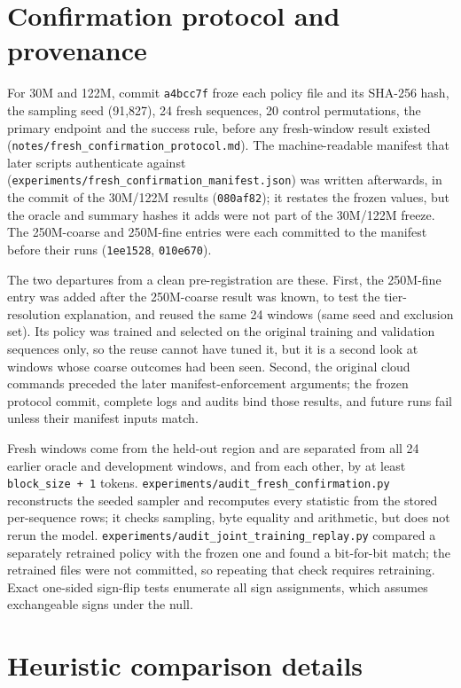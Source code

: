 \documentclass[11pt]{article}
\begin{document}
\section{Confirmation protocol and provenance}

For 30M and 122M, commit \texttt{a4bcc7f} froze each policy file and its SHA-256 hash, the sampling seed (91,827), 24 fresh sequences, 20 control permutations, the primary endpoint and the success rule, before any fresh-window result existed (\texttt{notes/\allowbreak fresh\_confirmation\_protocol.md}). The machine-readable manifest that later scripts authenticate against (\texttt{experiments/\allowbreak fresh\_confirmation\_manifest.json}) was written afterwards, in the commit of the 30M/122M results (\texttt{080af82}); it restates the frozen values, but the oracle and summary hashes it adds were not part of the 30M/122M freeze. The 250M-coarse and 250M-fine entries were each committed to the manifest before their runs (\texttt{1ee1528}, \texttt{010e670}).

The two departures from a clean pre-registration are these. First, the 250M-fine entry was added after the 250M-coarse result was known, to test the tier-resolution explanation, and reused the same 24 windows (same seed and exclusion set). Its policy was trained and selected on the original training and validation sequences only, so the reuse cannot have tuned it, but it is a second look at windows whose coarse outcomes had been seen. Second, the original cloud commands preceded the later manifest-enforcement arguments; the frozen protocol commit, complete logs and audits bind those results, and future runs fail unless their manifest inputs match.

Fresh windows come from the held-out region and are separated from all 24 earlier oracle and development windows, and from each other, by at least \texttt{block\_size + 1} tokens. \texttt{experiments/\allowbreak audit\_fresh\_confirmation.py} reconstructs the seeded sampler and recomputes every statistic from the stored per-sequence rows; it checks sampling, byte equality and arithmetic, but does not rerun the model. \texttt{experiments/\allowbreak audit\_joint\_training\_replay.py} compared a separately retrained policy with the frozen one and found a bit-for-bit match; the retrained files were not committed, so repeating that check requires retraining. Exact one-sided sign-flip tests enumerate all sign assignments, which assumes exchangeable signs under the null.

\section{Heuristic comparison details}
\end{document}
